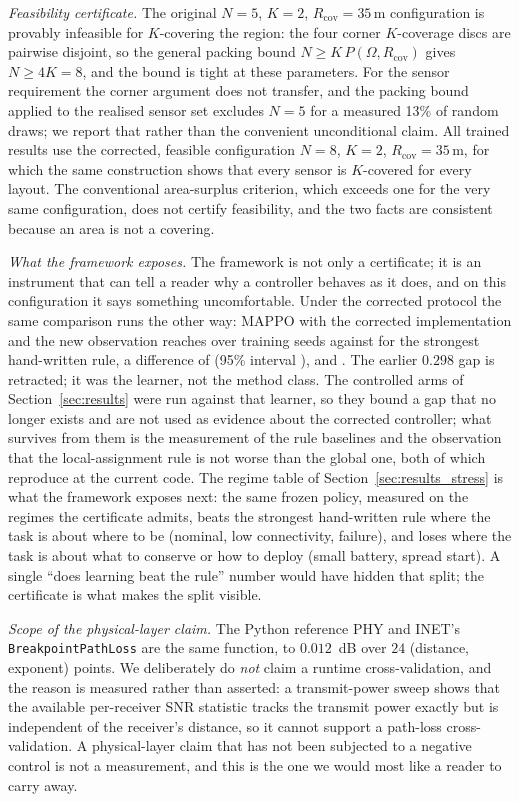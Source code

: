 \documentclass[conference]{IEEEtran}
\newcommand{\tokPhyDelta}{0.012}
\newcommand{\tokPhyRows}{24}
\begin{document}
\emph{Feasibility certificate.} The original $N=5$, $K=2$, $R_{\mathrm{cov}}=35$\,m configuration is provably infeasible for $K$-covering the region: the four corner $K$-coverage discs are pairwise disjoint, so the general packing bound $N\ge K\,P(\Omega,R_{\mathrm{cov}})$ gives $N\ge 4K=8$, and the bound is tight at these parameters. For the sensor requirement the corner argument does not transfer, and the packing bound applied to the realised sensor set excludes $N=5$ for a measured 13\% of random draws; we report that rather than the convenient unconditional claim. All trained results use the corrected, feasible configuration $N=8$, $K=2$, $R_{\mathrm{cov}}=35$\,m, for which the same construction shows that every sensor is $K$-covered for every layout. The conventional area-surplus criterion, which exceeds one for the very same configuration, does not certify feasibility, and the two facts are consistent because an area is not a covering.

\emph{What the framework exposes.} The framework is not only a certificate; it is an instrument that can tell a reader why a controller behaves as it does, and on this configuration it says something uncomfortable. Under the corrected protocol the same comparison runs the other way: MAPPO with the corrected implementation and the new observation reaches \tokEgoShapeCK{} over \tokEgoShapeN{} training seeds against \tokRuleReactiveLocalCK{} for the strongest hand-written rule, a difference of \tokLearnerMinusRule{} (95\% interval \tokLearnerMinusRuleCi), and \tokGapVerdict.  The earlier $0.298$ gap is retracted; it was the learner, not the method class.  The controlled arms of Section~\ref{sec:results} were run against that learner, so they bound a gap that no longer exists and are not used as evidence about the corrected controller; what survives from them is the measurement of the rule baselines and the observation that the local-assignment rule is not worse than the global one, both of which reproduce at the current code.  The regime table of Section~\ref{sec:results_stress} is what the framework exposes next: the same frozen policy, measured on the regimes the certificate admits, beats the strongest hand-written rule where the task is about where to be (nominal, low connectivity, failure), and loses where the task is about what to conserve or how to deploy (small battery, spread start).  A single ``does learning beat the rule'' number would have hidden that split; the certificate is what makes the split visible.

\emph{Scope of the physical-layer claim.} The Python reference PHY and INET's \texttt{BreakpointPathLoss} are the same function, to $\tokPhyDelta$~dB over $\tokPhyRows$ (distance, exponent) points. We deliberately do \emph{not} claim a runtime cross-validation, and the reason is measured rather than asserted: a transmit-power sweep shows that the available per-receiver SNR statistic tracks the transmit power exactly but is independent of the receiver's distance, so it cannot support a path-loss cross-validation. A physical-layer claim that has not been subjected to a negative control is not a measurement, and this is the one we would most like a reader to carry away.
\end{document}
